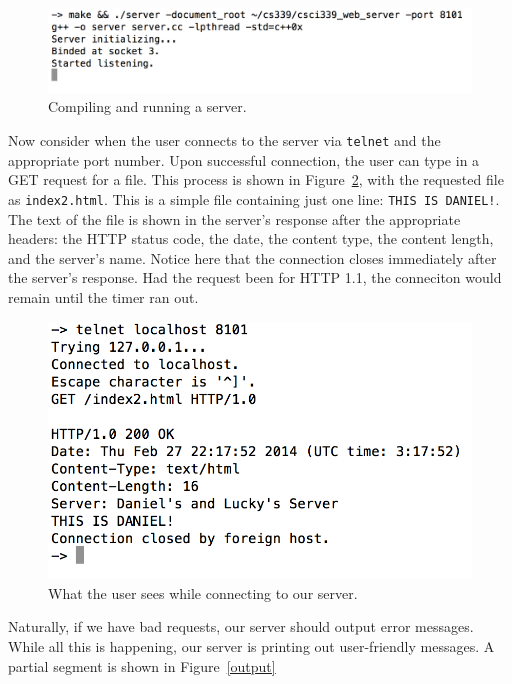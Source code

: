 \documentclass[letterpaper,11pt,twocolumn]{article}
\begin{document}
\begin{figure}[t]
  \centering
   \includegraphics[width=\columnwidth]{example1.png}     
  \caption{Compiling and running a server.\label{start}}
\end{figure} 

Now consider when the user connects to the server via \texttt{telnet} and the appropriate port number. Upon successful connection, the user can type
in a GET request for a file. This process is shown in Figure~\ref{request}, with the requested file as \texttt{index2.html}. This is a simple file
containing just one line: \texttt{THIS IS DANIEL!}. The text of the file is shown in the server's response after the appropriate headers: the HTTP
status code, the date, the content type, the content length, and the server's name. Notice here that the connection closes immediately after the
server's response. Had the request been for HTTP 1.1, the conneciton would remain until the timer ran out.

\begin{figure}[t]
  \centering
   \includegraphics[width=\columnwidth]{example2.png}     
  \caption{What the user sees while connecting to our server.\label{request}}
\end{figure} 

Naturally, if we have bad requests, our server should output error messages. While all this is happening, our server is printing out user-friendly
messages. A partial segment is shown in Figure~\ref{output}
\end{document}
